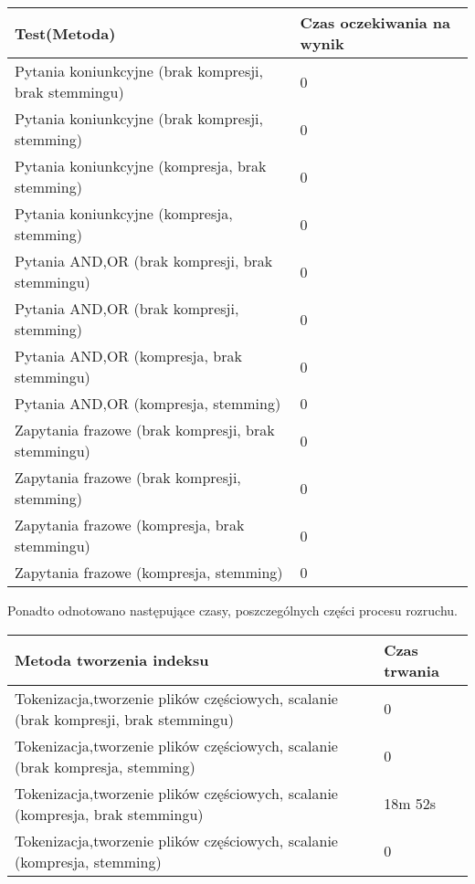 \documentclass[11pt,leqno]{article}
\begin{document}
\begin{tabular}{|l|l|}
\hline
Test(Metoda) & Czas oczekiwania na wynik\\
\hline
Pytania koniunkcyjne (brak kompresji, brak stemmingu) & 0\\
Pytania koniunkcyjne (brak kompresji, stemming) & 0\\
Pytania koniunkcyjne (kompresja, brak stemming) & 0\\
Pytania koniunkcyjne (kompresja, stemming) & 0\\
Pytania AND,OR (brak kompresji, brak stemmingu) & 0\\
Pytania AND,OR (brak kompresji, stemming) & 0\\
Pytania AND,OR (kompresja, brak stemmingu) & 0\\
Pytania AND,OR (kompresja, stemming) & 0\\
Zapytania frazowe (brak kompresji, brak stemmingu) & 0\\
Zapytania frazowe (brak kompresji, stemming) & 0\\
Zapytania frazowe (kompresja, brak stemmingu) & 0\\
Zapytania frazowe (kompresja, stemming) & 0\\
\hline
\end{tabular}

Ponadto odnotowano następujące czasy, poszczególnych części procesu rozruchu.

\begin{tabular}{|l|l|}
\hline
Metoda tworzenia indeksu & Czas trwania\\
\hline
Tokenizacja,tworzenie plików częściowych, scalanie (brak kompresji, brak stemmingu) & 0\\
Tokenizacja,tworzenie plików częściowych, scalanie (brak kompresja, stemming) & 0\\
Tokenizacja,tworzenie plików częściowych, scalanie (kompresja, brak stemmingu) & 18m 52s\\
Tokenizacja,tworzenie plików częściowych, scalanie (kompresja, stemming) & 0\\
\hline

\end{tabular}
\end{document}
